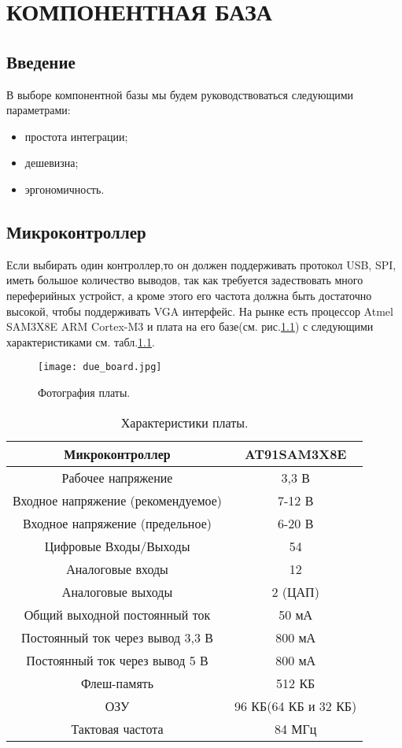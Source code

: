 \chapter{КОМПОНЕНТНАЯ БАЗА}
\section{Введение}
В выборе компонентной базы мы будем руководствоваться следующими параметрами:
\begin{itemize}
\item простота интеграции;
\item дешевизна;
\item эргономичность.
\end{itemize}

\section{Микроконтроллер}
Если выбирать один контроллер,то он должен поддерживать протокол USB, SPI, иметь большое количество выводов, так как требуется задествовать много переферийных устройст, а кроме этого его частота должна быть достаточно высокой, чтобы поддерживать VGA интерфейс. На рынке есть процессор Atmel SAM3X8E ARM Cortex-M3 и плата на его базе(см. рис.\ref{fig:DueBoard}) с следующими характеристиками см. табл.\ref{tab:DueBoard}\cite{s_1}.
\begin{figure}[ht]
	\centering
     \texttt{[image: due\_board.jpg]}
	\caption{Фотография платы.}
	\label{fig:DueBoard}
\end{figure}
\begin{table}
\centering
\begin{tabular}{|c|c|}
\hline 
Микроконтроллер & AT91SAM3X8E \\ 
\hline 
Рабочее напряжение & 3,3 В \\ 
\hline 
Входное напряжение (рекомендуемое) & 7-12 В \\ 
\hline 
Входное напряжение (предельное) & 6-20 В \\ 
\hline 
Цифровые Входы/Выходы & 54 \\ 
\hline 
Аналоговые входы & 12 \\ 
\hline 
Аналоговые выходы & 2 (ЦАП) \\ 
\hline 
Общий выходной постоянный ток & 50 мА \\ 
\hline 
Постоянный ток через вывод 3,3 В & 800 мА \\ 
\hline 
Постоянный ток через вывод 5 В & 800 мА \\ 
\hline 
Флеш-память & 512 КБ \\ 
\hline 
ОЗУ & 96 КБ(64 КБ и 32 КБ)\\ 
\hline 
Тактовая частота & 84 МГц \\ 
\hline 
\end{tabular} 
\caption{Характеристики платы.}
\label{tab:DueBoard}
\end{table}
